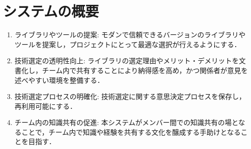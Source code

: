 \documentclass[main]{subfiles}
\begin{document}
\section{システムの概要}

\begin{enumerate}
\item ライブラリやツールの提案: モダンで信頼できるバージョンのライブラリやツールを提案し，プロジェクトにとって最適な選択が行えるようにする．

\item 技術選定の透明性向上: ライブラリの選定理由やメリット・デメリットを文書化し，チーム内で共有することにより納得感を高め，かつ関係者が意見を述べやすい環境を整備する．

\item 技術選定プロセスの明確化: 技術選定に関する意思決定プロセスを保存し，再利用可能にする．

\item チーム内の知識共有の促進: 本システムがメンバー間での知識共有の場となることで，チーム内で知識や経験を共有する文化を醸成する手助けとなることを目指す．
\end{enumerate}
\end{document}
